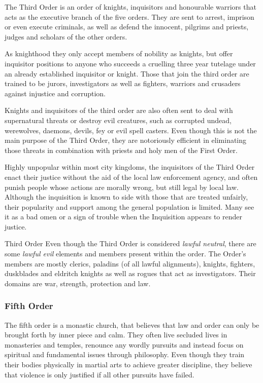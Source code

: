 The Third Order is an order of knights, inquisitors and honourable warriors
that acts as the executive branch of the five orders. They are sent to arrest,
imprison or even execute criminals, as well as defend the innocent, pilgrims
and priests, judges and scholars of the other orders.

As knighthood they only accept members of nobility as knights, but offer
inquisitor positions to anyone who succeeds a cruelling three year tutelage
under an already established inquisitor or knight. Those that join the third
order are trained to be jurors, investigators as well as fighters, warriors and
crusaders against injustice and corruption.

Knights and inquisitors of the third order are also often sent to deal with
supernatural threats or destroy evil creatures, such as corrupted undead,
werewolves, daemons, devils, fey or evil spell casters. Even though this is
not the main purpose of the Third Order, they are notoriously efficient in
eliminating those threats in combination with priests and holy men of the
First Order.

Highly unpopular within most city kingdoms, the inquisitors of the Third Order
enact their justice without the aid of the local law enforcement agency, and
often punish people whose actions are morally wrong, but still legal by local
law. Although the inquisition is known to side with those that are treated
unfairly, their popularity and support among the general population is
limited. Many see it as a bad omen or a sign of trouble when the Inquisition
appears to render justice.

\begin{35e}{Third Order}
  Even though the Third Order is considered \emph{lawful neutral}, there are
  some \emph{lawful evil} elements and members present within the order. The
  Order's members are mostly clerics, paladins (of all lawful alignments),
  knights, fighters, duskblades and eldritch knights as well as rogues that
  act as investigators. Their domains are war, strength, protection and law.
\end{35e}

\subsubsection{Fifth Order}
\label{sec:Fifth Order}

The fifth order is a monastic church, that believes that law and order can only
be brought forth by inner piece and calm. They often live secluded lives in
monasteries and temples, renounce any wordly pursuits and instead focus on
spiritual and fundamental issues through philosophy. Even though they train
their bodies physically in martial arts to achieve greater discipline, they
believe that violence is only justified if all other pursuits have failed.

